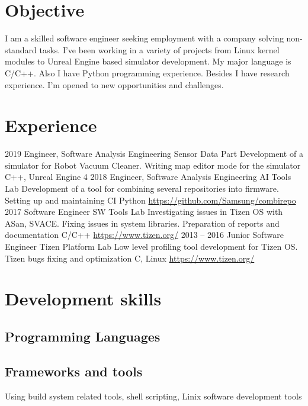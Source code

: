 \documentclass[11pt,a4paper]{moderncv}
\begin{document}
\maketitle

\section{Objective}
\cvitem {} {I am a skilled software engineer seeking employment with a company solving non-standard tasks.
I've been working in a variety of projects from Linux kernel modules to Unreal Engine based simulator development. 
My major language is C/C++. Also I have Python programming experience.
Besides I have research experience. I'm opened to new opportunities and challenges.}
\section{Experience}
\cventry
  {2019}
  {Engineer, Software Analysis Engineering}
  {Sensor Data Part}
  {Development of a simulator for Robot Vacuum Cleaner. Writing map editor mode for the simulator}
  {C++, Unreal Engine 4}
  {}
\cventry
  {2018}
  {Engineer, Software Analysis Engineering}
  {AI Tools Lab}
  {Development of a tool for combining several repositories into firmware. Setting up and maintaining CI}
  {Python}
  {\url{https://github.com/Samsung/combirepo}}
\cventry
  {2017}
  {Software Engineer}
  {SW Tools Lab}
  {Investigating issues in Tizen OS with ASan, SVACE. Fixing issues in system libraries.
  Preparation of reports and documentation}
  {C/C++}
  {\url{https://www.tizen.org/}}
\cventry
  {2013 -- 2016}
  {Junior Software Engineer}
  {Tizen Platform Lab}
  {Low level profiling tool development for Tizen OS. Tizen bugs fixing and optimization}
  {C, Linux}
  {\url{https://www.tizen.org/}}

\section{Development skills}
\subsection{Programming Languages}
\subsection{Frameworks and tools}
 {Using build system related tools, shell scripting, Linix software development tools}
\end{document}
